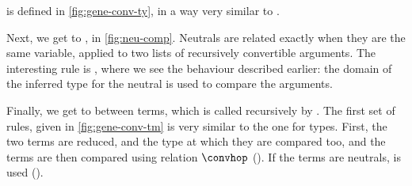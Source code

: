  is defined in \cref{fig:gene-conv-ty}, in a way very similar to
.

\begin{figure*}[h]
  \ContinuedFloat
  \caption{}
  \label{fig:neu-comp}
\end{figure*}

Next, we get to , in \cref{fig:neu-comp}. Neutrals are
related exactly when they are the same variable, applied to two lists of recursively convertible arguments. The interesting rule is , where we see
the behaviour described earlier: the domain of the inferred type for the neutral is used to
compare the arguments.

\begin{figure*}[h]
  \ContinuedFloat
  \caption{ between terms at the universe}
  \label{fig:gene-conv-tm}
\end{figure*}

Finally, we get to  between terms, which is called recursively by
.
The first set of rules, given in \cref{fig:gene-conv-tm} is very similar to the one for types.
First, the two terms are reduced, and the type at which they are compared too,
and the terms are then compared using relation $\convhop$
(). If the terms are neutrals,  is used
().

